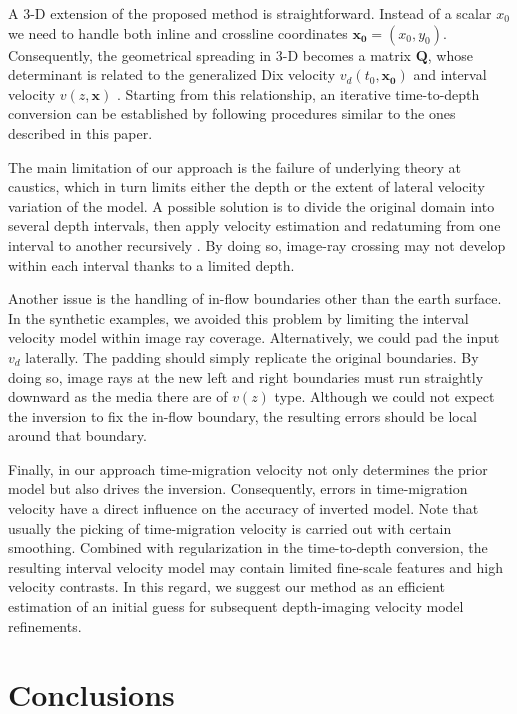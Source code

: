 A 3-D extension of the proposed method is straightforward. Instead of a scalar $x_0$ we 
need to handle both inline and crossline coordinates $\mathbf{x_0} = (x_0, y_0)$. Consequently, the geometrical 
spreading in 3-D becomes a matrix $\mathbf{Q}$, whose determinant 
is related to the generalized Dix velocity $v_d (t_0,\mathbf{x_0})$ and interval velocity $v (z,\mathbf{x})$ 
\cite[]{cameron1}. Starting from this relationship, an iterative time-to-depth conversion can be established by 
following procedures similar to the ones described in this paper.

The main limitation of our approach is the failure of underlying theory at caustics, which in turn limits either 
the depth or the extent of lateral velocity variation of the model. A possible solution is to divide 
the original domain into several depth intervals, then apply velocity estimation and redatuming 
from one interval to another recursively \cite[]{bevc1,li2}. By doing so, image-ray crossing may 
not develop within each interval thanks to a limited depth.

Another issue is the handling of in-flow boundaries other than the earth surface. In the synthetic examples, 
we avoided this problem by limiting the interval velocity model within image ray coverage. Alternatively, we could 
pad the input $v_d$ laterally. The padding should simply replicate the original boundaries. By doing so, image 
rays at the new left and right boundaries must run straightly downward as the media there are of $v (z)$ type. 
Although we could not expect the inversion to fix the in-flow boundary, the resulting errors should be local 
around that boundary.

Finally, in our approach time-migration velocity not only determines the prior model but also 
drives the inversion. Consequently, errors in time-migration velocity have a direct influence on the accuracy of 
inverted model. Note that usually the picking of time-migration velocity is carried out with 
certain smoothing. Combined with regularization in the time-to-depth conversion, the resulting interval velocity 
model may contain limited fine-scale features and high velocity contrasts. In this regard, we suggest our method 
as an efficient estimation of an initial guess for subsequent depth-imaging velocity model refinements.

\section{Conclusions}

